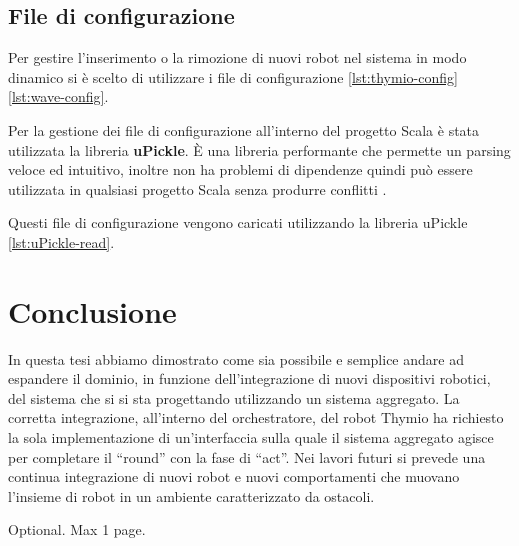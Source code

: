 \documentclass[12pt,a4paper,openright,twoside]{book}
\begin{document}
\section{File di configurazione}

Per gestire l'inserimento o la rimozione di nuovi robot nel sistema in modo dinamico si è scelto di utilizzare i file di configurazione \cref{lst:thymio-config} \cref{lst:wave-config}.

Per la gestione dei file di configurazione all'interno del progetto Scala è stata utilizzata la libreria \textbf{uPickle}. È una libreria performante che permette un parsing veloce ed intuitivo, inoltre non ha problemi di dipendenze quindi può essere utilizzata in qualsiasi progetto Scala senza produrre conflitti \cite{uPickle}.





Questi file di configurazione vengono caricati utilizzando la libreria uPickle \cite{uPickle} \cref{lst:uPickle-read}.



\chapter{Conclusione}
\label{chap:conclusione}

In questa tesi abbiamo dimostrato come sia possibile e semplice andare ad espandere il dominio, in funzione dell'integrazione di nuovi dispositivi robotici, del sistema che si si sta progettando utilizzando un sistema aggregato. La corretta integrazione, all'interno del orchestratore, del robot Thymio ha richiesto la sola implementazione di un'interfaccia sulla quale il sistema aggregato agisce per completare il ``round'' con la fase di ``act''. 
Nei lavori futuri si prevede una continua integrazione di nuovi robot e nuovi comportamenti che muovano l'insieme di robot in un ambiente caratterizzato da ostacoli.


\backmatter




\begin{acknowledgements} %
Optional. Max 1 page.
\end{acknowledgements}
\end{document}
